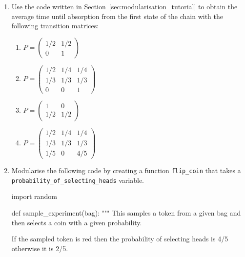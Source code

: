 \begin{enumerate}

\item 

Use the code written in Section~\ref{sec:modularisation_tutorial} to obtain the average time
until absorption from the first state of the  chain with the following transition 
matrices:
\begin{enumerate}

\item 

\(P = \begin{pmatrix}1/2 & 1/2 \\ 0 & 1 \end{pmatrix}\)

\item 

\(P = \begin{pmatrix}1/2 & 1/4 & 1/4\\ 1/3 & 1/3 & 1/3  \\0 & 0 & 1 \end{pmatrix}\)

\item 

\(P = \begin{pmatrix}1 & 0 \\ 1/2 & 1/2 \end{pmatrix}\)

\item 

\(P = \begin{pmatrix}1/2 & 1/4 & 1/4\\ 1/3 & 1/3 & 1/3  \\1/5 & 0 & 4/5 \end{pmatrix}\)

\end{enumerate}

\item 

Modularise the following code by creating a function \texttt{flip\_coin} that takes a
\texttt{probability\_of\_selecting\_heads} variable.

\begin{pyin}
import random

def sample_experiment(bag):
    """
    This samples a token from a given bag and then
    selects a coin with a given probability.

    If the sampled token is red then the probability
    of selecting heads is 4/5 otherwise it is 2/5.


\end{pyin}
\end{enumerate}

